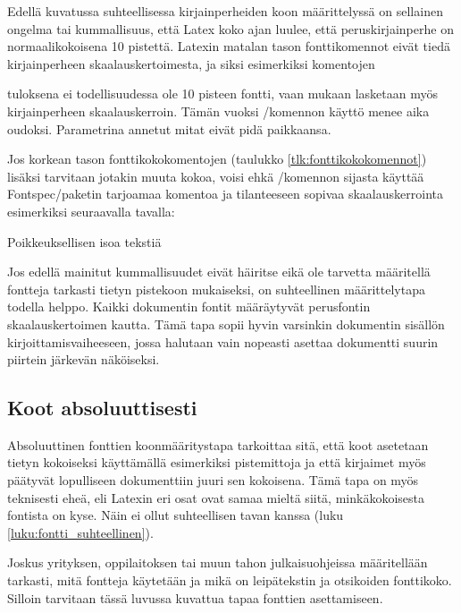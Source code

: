 Edellä kuvatussa suhteellisessa kirjainperheiden koon määrittelyssä on
sellainen ongelma tai kummallisuus, että Latex koko ajan luulee, että
peruskirjainperhe on normaalikokoisena 10 pistettä. Latexin matalan
tason fonttikomennot eivät tiedä kirjainperheen skaalauskertoimesta, ja
siksi esimerkiksi komentojen

\begin{koodilohkosis}
  \fontsize{10pt}{12pt} \selectfont
\end{koodilohkosis}

tuloksena ei todellisuudessa ole 10 pisteen fontti, vaan mukaan
lasketaan myös kirjainperheen skaalauskerroin. Tämän vuoksi \-/komennon käyttö menee aika oudoksi. Parametrina annetut
mitat eivät pidä paikkaansa.

Jos korkean tason font\-ti\-koko\-komen\-to\-jen (taulukko
\ref{tlk:fonttikokokomennot}) lisäksi tarvitaan jotakin muuta kokoa,
voisi ehkä \-/komennon sijasta käyttää
Fontspec\-/paketin tarjoamaa komentoa ja tilanteeseen sopivaa
skaalauskerrointa esimerkiksi seuraavalla tavalla:

\begin{koodilohkosis}
   Poikkeuksellisen isoa tekstiä
\end{koodilohkosis}

Jos edellä mainitut kummallisuudet eivät häiritse eikä ole tarvetta
määritellä fontteja tarkasti tietyn pistekoon mukaiseksi, on
suhteellinen määrittelytapa todella helppo. Kaikki dokumentin fontit
määräytyvät perusfontin skaalauskertoimen kautta. Tämä tapa sopii hyvin
varsinkin dokumentin sisällön kirjoittamisvaiheeseen, jossa halutaan
vain nopeasti asettaa dokumentti suurin piirtein järkevän näköiseksi.

\subsection{Koot absoluuttisesti}
\label{luku:fontti_absoluuttinen}

Absoluuttinen fonttien koonmääritystapa tarkoittaa sitä, että koot
asetetaan tietyn kokoiseksi käyttämällä esimerkiksi pistemittoja ja että
kirjaimet myös päätyvät lopulliseen dokumenttiin juuri sen kokoisena.
Tämä tapa on myös teknisesti eheä, eli Latexin eri osat ovat samaa
mieltä siitä, minkäkokoisesta fontista on kyse. Näin ei ollut
suhteellisen tavan kanssa (luku \ref{luku:fontti_suhteellinen}).

Joskus yrityksen, oppilaitoksen tai muun tahon julkaisu\-ohjeissa
määritellään tarkasti, mitä fontteja käytetään ja mikä on leipätekstin
ja otsikoiden fonttikoko. Silloin tarvitaan tässä luvussa kuvattua tapaa
fonttien asettamiseen.

